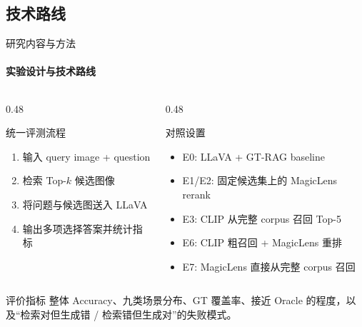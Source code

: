 \documentclass[10pt,aspectratio=169,]{beamer}
\begin{document}
\subsection{技术路线}
\begin{frame}{研究内容与方法}
	\framesubtitle{实验设计与技术路线}
	\begin{columns}[T]
		\begin{column}{0.48\textwidth}
			\begin{block}{统一评测流程}
				\begin{enumerate}
					\item 输入 query image + question
					\item 检索 Top-$k$ 候选图像
					\item 将问题与候选图送入 LLaVA
					\item 输出多项选择答案并统计指标
				\end{enumerate}
			\end{block}
		\end{column}
		\begin{column}{0.48\textwidth}
			\begin{alertblock}{对照设置}
				\begin{itemize}
					\item E0: LLaVA + GT-RAG baseline
					\item E1/E2: 固定候选集上的 MagicLens rerank
					\item E3: CLIP 从完整 corpus 召回 Top-5
					\item E6: CLIP 粗召回 + MagicLens 重排
					\item E7: MagicLens 直接从完整 corpus 召回
				\end{itemize}
			\end{alertblock}
		\end{column}
	\end{columns}
	\vspace{0.5em}
	\begin{block}{评价指标}
		整体 Accuracy、九类场景分布、GT 覆盖率、接近 Oracle 的程度，以及“检索对但生成错 / 检索错但生成对”的失败模式。
	\end{block}
\end{frame}
\end{document}
